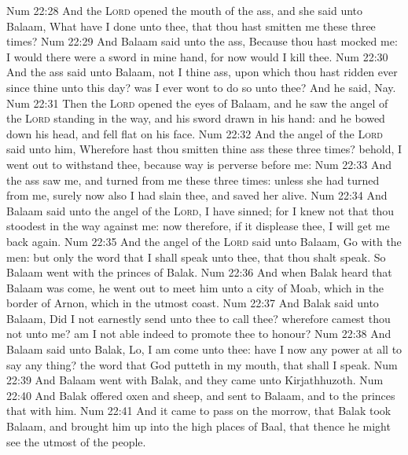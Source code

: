 \vs Num 22:28 And the \textsc{Lord} opened the mouth of the ass, and she said unto Balaam, What have I done unto thee, that thou hast smitten me these three times?
\vs Num 22:29 And Balaam said unto the ass, Because thou hast mocked me: I would there were a sword in mine hand, for now would I kill thee.
\vs Num 22:30 And the ass said unto Balaam,  not I thine ass, upon which thou hast ridden ever since  thine unto this day? was I ever wont to do so unto thee? And he said, Nay.
\vs Num 22:31 Then the \textsc{Lord} opened the eyes of Balaam, and he saw the angel of the \textsc{Lord} standing in the way, and his sword drawn in his hand: and he bowed down his head, and fell flat on his face.
\vs Num 22:32 And the angel of the \textsc{Lord} said unto him, Wherefore hast thou smitten thine ass these three times? behold, I went out to withstand thee, because  way is perverse before me:
\vs Num 22:33 And the ass saw me, and turned from me these three times: unless she had turned from me, surely now also I had slain thee, and saved her alive.
\vs Num 22:34 And Balaam said unto the angel of the \textsc{Lord}, I have sinned; for I knew not that thou stoodest in the way against me: now therefore, if it displease thee, I will get me back again.
\vs Num 22:35 And the angel of the \textsc{Lord} said unto Balaam, Go with the men: but only the word that I shall speak unto thee, that thou shalt speak. So Balaam went with the princes of Balak.
\vs Num 22:36 And when Balak heard that Balaam was come, he went out to meet him unto a city of Moab, which  in the border of Arnon, which  in the utmost coast.
\vs Num 22:37 And Balak said unto Balaam, Did I not earnestly send unto thee to call thee? wherefore camest thou not unto me? am I not able indeed to promote thee to honour?
\vs Num 22:38 And Balaam said unto Balak, Lo, I am come unto thee: have I now any power at all to say any thing? the word that God putteth in my mouth, that shall I speak.
\vs Num 22:39 And Balaam went with Balak, and they came unto Kirjathhuzoth.
\vs Num 22:40 And Balak offered oxen and sheep, and sent to Balaam, and to the princes that  with him.
\vs Num 22:41 And it came to pass on the morrow, that Balak took Balaam, and brought him up into the high places of Baal, that thence he might see the utmost  of the people.
